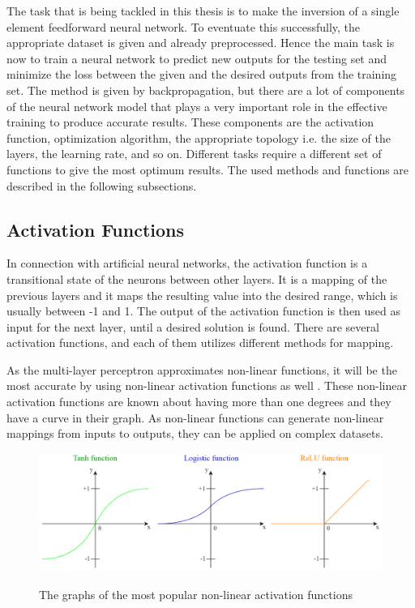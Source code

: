 The task that is being tackled in this thesis is to make the inversion of a single element feedforward neural network. To eventuate this successfully, the appropriate dataset is given and already preprocessed. Hence the main task is now to train a neural network to predict new outputs for the testing set and minimize the loss between the given and the desired outputs from the training set. The method is given by backpropagation, but there are a lot of components of the neural network model that plays a very important role in the effective training to produce accurate results. These components are the activation function, optimization algorithm, the appropriate topology i.e. the size of the layers, the learning rate, and so on. Different tasks require a different set of functions to give the most optimum results. The used methods and functions are described in the following subsections.


\subsection{Activation Functions}

In connection with artificial neural networks, the activation function is a transitional state of the neurons between other layers. It is a mapping of the previous layers and it maps the resulting value into the desired range, which is usually between -1 and 1. The output of the activation function is then used as input for the next layer, until a desired solution is found. There are several activation functions, and each of them utilizes different methods for mapping. \medskip

As the multi-layer perceptron approximates non-linear functions, it will be the most accurate by using non-linear activation functions as well \cite{pillo2013nonlinear}. These non-linear activation functions are known about having more than one degrees and they have a curve in their graph. As non-linear functions can generate non-linear mappings from inputs to outputs, they can be applied on complex datasets. 

\begin{figure}[h]
	\centering
	\caption{The graphs of the most popular non-linear activation functions}
	\includegraphics[height=0.35\linewidth]{./figures/functions}
	\label{fig:functions}
\end{figure}

